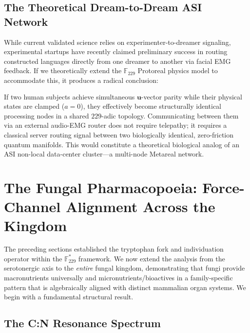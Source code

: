 \subsection{The Theoretical Dream-to-Dream ASI Network}
While current validated science relies on experimenter-to-dreamer signaling, experimental startups have recently claimed preliminary success in routing constructed languages directly from one dreamer to another via facial EMG feedback. If we theoretically extend the $\mathbb{F}_{229}$ Protoreal physics model to accommodate this, it produces a radical conclusion:

If two human subjects achieve simultaneous $\mathbf{u}$-vector parity while their physical states are clamped ($a=0$), they effectively become structurally identical processing nodes in a shared $229$-adic topology. Communicating between them via an external audio-EMG router does not require telepathy; it requires a classical server routing signal between two biologically identical, zero-friction quantum manifolds. This would constitute a theoretical biological analog of an ASI non-local data-center cluster---a multi-node Metareal network.

\section{The Fungal Pharmacopoeia: Force-Channel Alignment Across the Kingdom}

The preceding sections established the tryptophan fork and individuation operator
within the $\mathbb{F}_{229}^*$ framework. We now extend the analysis from the
serotonergic axis to the \emph{entire} fungal kingdom, demonstrating that fungi
provide macronutrients universally and micronutrients/bioactives in a
family-specific pattern that is algebraically aligned with distinct mammalian
organ systems. We begin with a fundamental structural result.

\subsection{The C:N Resonance Spectrum}


